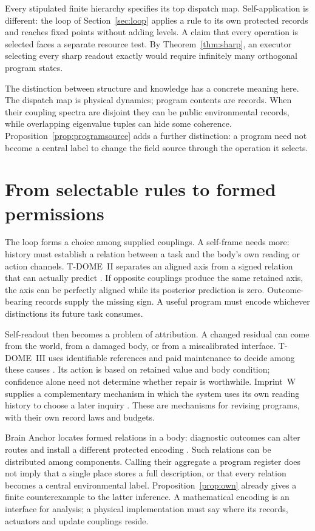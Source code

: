 \documentclass[12pt,a4paper]{article}
\begin{document}
Every stipulated finite hierarchy specifies its top dispatch map. Self-application is different: the loop of Section~\ref{sec:loop} applies a rule to its own protected records and reaches fixed points without adding levels. A claim that every operation is selected faces a separate resource test. By Theorem~\ref{thm:sharp}, an executor selecting every sharp readout exactly would require infinitely many orthogonal program states.

The distinction between structure and knowledge has a concrete meaning here. The dispatch map is physical dynamics; program contents are records. When their coupling spectra are disjoint they can be public environmental records, while overlapping eigenvalue tuples can hide some coherence. Proposition~\ref{prop:programsource} adds a further distinction: a program need not become a central label to change the field source through the operation it selects.

\section{From selectable rules to formed permissions}
\label{sec:formation}

The loop forms a choice among supplied couplings. A self-frame needs more: history must establish a relation between a task and the body's own reading or action channels. T-DOME~II separates an aligned axis from a signed relation that can actually predict \cite{TDOMEII}. If opposite couplings produce the same retained axis, the axis can be perfectly aligned while its posterior prediction is zero. Outcome-bearing records supply the missing sign. A useful program must encode whichever distinctions its future task consumes.

Self-readout then becomes a problem of attribution. A changed residual can come from the world, from a damaged body, or from a miscalibrated interface. T-DOME~III uses identifiable references and paid maintenance to decide among these causes \cite{TDOMEIII}. Its action is based on retained value and body condition; confidence alone need not determine whether repair is worthwhile. Imprint~W supplies a complementary mechanism in which the system uses its own reading history to choose a later inquiry \cite{WorldImprint}. These are mechanisms for revising programs, with their own record laws and budgets.

Brain Anchor locates formed relations in a body: diagnostic outcomes can alter routes and install a different protected encoding \cite{BrainAnchor}. Such relations can be distributed among components. Calling their aggregate a program register does not imply that a single place stores a full description, or that every relation becomes a central environmental label. Proposition~\ref{prop:own} already gives a finite counterexample to the latter inference. A mathematical encoding is an interface for analysis; a physical implementation must say where its records, actuators and update couplings reside.
\end{document}
